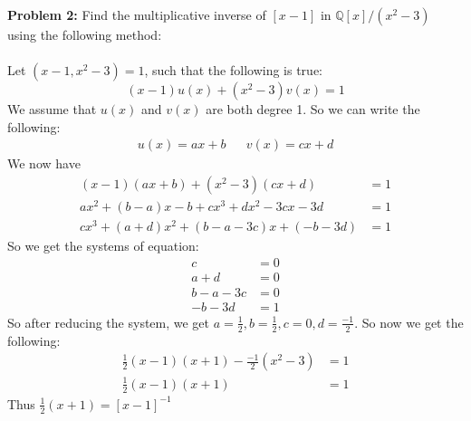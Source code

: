\documentclass[12pt]{article}
\begin{document}
\noindent \textbf{Problem 2: }Find the multiplicative inverse of $[x - 1]$ in $\mathbb{Q}[x]/(x^2 - 3)$ using the following method:
	\\ \\
	Let $(x-1, x^2 - 3) = 1$, such that the following is true:
		$$
		(x-1)u(x) + (x^2 - 3)v(x) = 1
		$$
	We assume that $u(x)$ and $v(x)$ are both degree 1. So we can write the following:
		\begin{align*}
				u(x) = ax + b && v(x) = cx + d
		\end{align*}
	We now have 
		\begin{align*}
			(x-1)(ax+b) + (x^2 - 3)(cx + d) &= 1 \\
			ax^2 + (b-a)x - b + cx^3 + dx^2 - 3cx - 3d &= 1 \\
			cx^3 + (a+d)x^2 + (b-a-3c)x + (-b - 3d) &= 1
		\end{align*}
	So we get the systems of equation:	
		\begin{align*}
			c &= 0 \\
			a + d &= 0 \\
			b - a - 3c &= 0 \\
			-b - 3d &= 1
		\end{align*}
	So after reducing the system, we get $a = \frac{1}{2}, b = \frac{1}{2}, c = 0, d = \frac{-1}{2}$. So now we get the following:
		\begin{align*}
			\frac{1}{2}(x-1)(x + 1) - \frac{-1}{2}(x^2 - 3) &= 1 \\
			\frac{1}{2}(x-1)(x + 1) &= 1
		\end{align*}
	Thus $\frac{1}{2}(x + 1) = [x-1]^{-1}$
\newpage 
\end{document}
